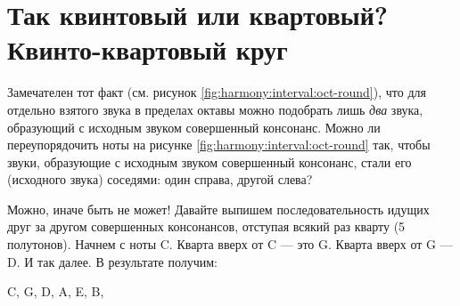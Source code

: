 \section{Так квинтовый или квартовый? Квинто-квартовый круг}
\label{ch:harmony:kvinto-kvarto-round}

Замечателен тот факт (см. рисунок \ref{fig:harmony:interval:oct-round}), что для отдельно взятого звука в пределах октавы можно подобрать лишь \emph{два} звука, образующий с исходным звуком совершенный консонанс. Можно ли переупорядочить ноты на рисунке \ref{fig:harmony:interval:oct-round} так, чтобы звуки, образующие с исходным звуком совершенный консонанс, стали его (исходного звука) соседями: один справа, другой слева?

Можно, иначе быть не может! Давайте выпишем последовательность идущих друг за другом совершенных консонансов, отступая всякий раз кварту (5 полутонов). Начнем с ноты C. Кварта вверх от C --- это G. Кварта вверх от G --- D. И так далее. В результате получим:
\begin{center}
    C, G, D, A, E, B, 
\end{center}
